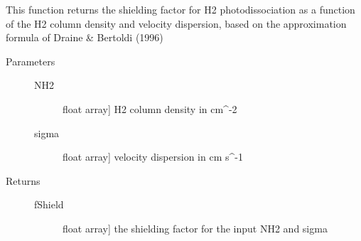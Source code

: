 \documentclass[letterpaper,10pt,english]{sphinxmanual}
\begin{document}
\begin{fulllineitems}
\label{fulldoc:despotic.chemistry.shielding.fShield_H2_DB}
This function returns the shielding factor for H2
photodissociation as a function of the H2 column density and
velocity dispersion, based on the approximation formula of Draine
\& Bertoldi (1996)
\begin{description}
\item[{Parameters}] \leavevmode\begin{description}
\item[{NH2}] \leavevmode{[}float \textbar{} array{]}
H2 column density in cm\textasciicircum{}-2

\item[{sigma}] \leavevmode{[}float \textbar{} array{]}
velocity dispersion in cm s\textasciicircum{}-1

\end{description}

\item[{Returns}] \leavevmode\begin{description}
\item[{fShield}] \leavevmode{[}float \textbar{} array{]}
the shielding factor for the input NH2 and sigma

\end{description}

\end{description}

\end{fulllineitems}

\end{document}
